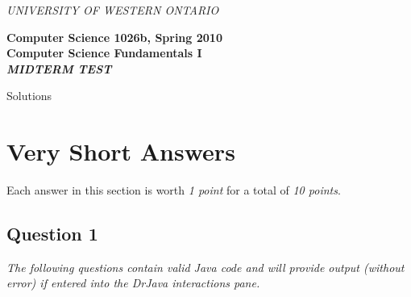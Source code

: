 \documentclass[12pt]{report}
\begin{document}
{\large
\begin{center}
{\it UNIVERSITY OF WESTERN ONTARIO}
\end{center}
\begin{center}
\bf{Computer Science 1026b, Spring 2010}\\
\large{\bf{Computer Science Fundamentals I}}\\
{\large{\it MIDTERM TEST }}\\
\end{center}
}

\vspace{8cm}
\begin{center}{\Huge{Solutions}}\end{center}
\clearpage

\section*{Very Short Answers}
Each answer in this section is worth \emph{1 point} for a total of \emph{10 points}.
\subsection*{Question 1}
\emph{The following questions contain valid Java code and will provide output (without error) if entered into 
the DrJava interactions pane.} 
\end{document}
